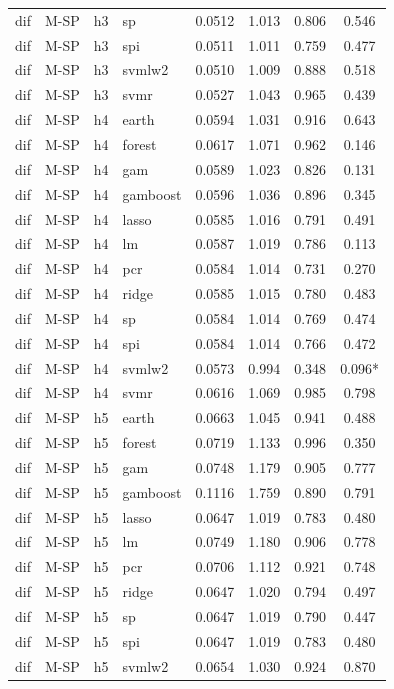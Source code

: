 \begin{ThreePartTable}
\begin{longtable}[t]{llclcccc}
dif & M-SP & h3 & sp & 0.0512 & 1.013 & 0.806 & 0.546\\
dif & M-SP & h3 & spi & 0.0511 & 1.011 & 0.759 & 0.477\\
dif & M-SP & h3 & svmlw2 & 0.0510 & 1.009 & 0.888 & 0.518\\
dif & M-SP & h3 & svmr & 0.0527 & 1.043 & 0.965 & 0.439\\
\addlinespace
dif & M-SP & h4 & earth & 0.0594 & 1.031 & 0.916 & 0.643\\
dif & M-SP & h4 & forest & 0.0617 & 1.071 & 0.962 & 0.146\\
dif & M-SP & h4 & gam & 0.0589 & 1.023 & 0.826 & 0.131\\
dif & M-SP & h4 & gamboost & 0.0596 & 1.036 & 0.896 & 0.345\\
dif & M-SP & h4 & lasso & 0.0585 & 1.016 & 0.791 & 0.491\\
dif & M-SP & h4 & lm & 0.0587 & 1.019 & 0.786 & 0.113\\
dif & M-SP & h4 & pcr & 0.0584 & 1.014 & 0.731 & 0.270\\
dif & M-SP & h4 & ridge & 0.0585 & 1.015 & 0.780 & 0.483\\
dif & M-SP & h4 & sp & 0.0584 & 1.014 & 0.769 & 0.474\\
dif & M-SP & h4 & spi & 0.0584 & 1.014 & 0.766 & 0.472\\
dif & M-SP & h4 & svmlw2 & 0.0573 & 0.994 & 0.348 & 0.096*\\
dif & M-SP & h4 & svmr & 0.0616 & 1.069 & 0.985 & 0.798\\
\addlinespace
dif & M-SP & h5 & earth & 0.0663 & 1.045 & 0.941 & 0.488\\
dif & M-SP & h5 & forest & 0.0719 & 1.133 & 0.996 & 0.350\\
dif & M-SP & h5 & gam & 0.0748 & 1.179 & 0.905 & 0.777\\
dif & M-SP & h5 & gamboost & 0.1116 & 1.759 & 0.890 & 0.791\\
dif & M-SP & h5 & lasso & 0.0647 & 1.019 & 0.783 & 0.480\\
dif & M-SP & h5 & lm & 0.0749 & 1.180 & 0.906 & 0.778\\
dif & M-SP & h5 & pcr & 0.0706 & 1.112 & 0.921 & 0.748\\
dif & M-SP & h5 & ridge & 0.0647 & 1.020 & 0.794 & 0.497\\
dif & M-SP & h5 & sp & 0.0647 & 1.019 & 0.790 & 0.447\\
dif & M-SP & h5 & spi & 0.0647 & 1.019 & 0.783 & 0.480\\
dif & M-SP & h5 & svmlw2 & 0.0654 & 1.030 & 0.924 & 0.870\\

\end{longtable}
\end{ThreePartTable}
